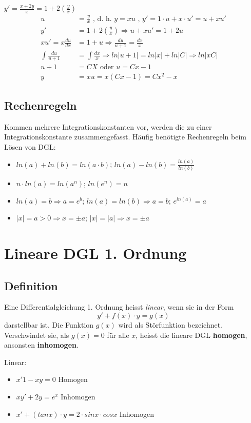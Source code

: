 \begin{bsp}
$y' = \frac{x+2y}{x} = 1 + 2\left(\frac{y}{x}\right)$
\begin{align*}
u &= \frac{y}{x} \text{ , d. h. } y=xu \text{ , } y' = 1 \cdot u + x \cdot u' = u + xu' \\
y' &= 1 + 2\left(\frac{y}{x}\right) \Rightarrow u + xu' = 1+ 2u\\
xu' = x \frac{du}{dx} &= 1 + u \Rightarrow \frac{du}{u+1} = \frac{dx}{x} \\
\int \frac{du}{u+1} &= \int \frac{dx}{x} \Rightarrow ln|u + 1| = ln|x| + ln |C| \Rightarrow ln|xC| \\
u + 1 &= C X \text{  oder } u = Cx -1\\
y & = xu = x(Cx -1) = Cx^2-x
\end{align*}
\end{bsp}

\subsection{Rechenregeln}
Kommen mehrere Integrationskonstanten vor, werden die zu einer Integrationskonstante zusammengefasst.
Häufig benötigte Rechenregeln beim Lösen von DGL:
\begin{itemize}
		\item $ln(a) + ln(b) = ln ( a \cdot b)$; $ln(a) - ln(b) = \frac{ln(a)}{ln(b)}$
		\item $n \cdot ln (a) = ln (a^n)$; $ln (e^n)  = n$
		\item $ ln (a) = b \Rightarrow a = e^b$; $ln(a) = ln (b) \Rightarrow a = b$; $e^{ln(a)} = a$
		\item $|x| = a > 0 \Rightarrow x = \pm a$; $|x| = |a| \Rightarrow x = \pm a$
\end{itemize}

\section{Lineare DGL 1. Ordnung}
\subsection{Definition}
\begin{definition}
Eine Differentialgleichung 1. Ordnung heisst \textit{linear}, wenn sie in der Form
$$y' + f(x) \cdot y = g(x)$$
darstellbar ist. Die Funktion $g(x)$ wird als Störfunktion bezeichnet. Verschwindet sie, als $g(x) = 0$ für alle $x$, heisst die lineare DGL \textbf{homogen}, ansonsten \textbf{inhomogen}.
\end{definition}
\begin{bsp}
Linear:
\begin{itemize}
	\item $x'1 -xy = 0$ Homogen
	\item $xy' + 2y = e^x$ Inhomogen
	\item $x' + (tanx)\cdot y = 2 \cdot sinx \cdot cos x$ Inhomogen
\end{itemize}
\end{bsp}

